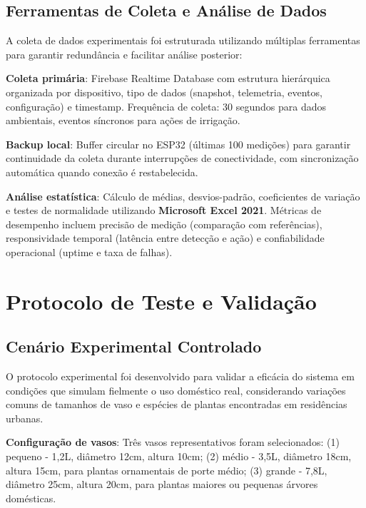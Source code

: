 \documentclass[twoside,english,brazilian]{UNISINOSmonografia}
\begin{document}
\subsection{Ferramentas de Coleta e Análise de Dados}

A coleta de dados experimentais foi estruturada utilizando múltiplas ferramentas para garantir redundância e facilitar análise posterior:

\textbf{Coleta primária}: Firebase Realtime Database com estrutura hierárquica organizada por dispositivo, tipo de dados (snapshot, telemetria, eventos, configuração) e timestamp. Frequência de coleta: 30 segundos para dados ambientais, eventos síncronos para ações de irrigação.

\textbf{Backup local}: Buffer circular no ESP32 (últimas 100 medições) para garantir continuidade da coleta durante interrupções de conectividade, com sincronização automática quando conexão é restabelecida.

\textbf{Análise estatística}: Cálculo de médias, desvios-padrão, coeficientes de variação e testes de normalidade utilizando \textbf{Microsoft Excel 2021}. Métricas de desempenho incluem precisão de medição (comparação com referências), responsividade temporal (latência entre detecção e ação) e confiabilidade operacional (uptime e taxa de falhas).

\section{Protocolo de Teste e Validação}

\subsection{Cenário Experimental Controlado}

O protocolo experimental foi desenvolvido para validar a eficácia do sistema em condições que simulam fielmente o uso doméstico real, considerando variações comuns de tamanhos de vaso e espécies de plantas encontradas em residências urbanas.

\textbf{Configuração de vasos}: Três vasos representativos foram selecionados: (1) pequeno - 1,2L, diâmetro 12cm, altura 10cm; (2) médio - 3,5L, diâmetro 18cm, altura 15cm, para plantas ornamentais de porte médio; (3) grande - 7,8L, diâmetro 25cm, altura 20cm, para plantas maiores ou pequenas árvores domésticas.
\end{document}

